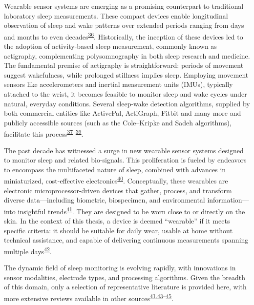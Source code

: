\documentclass[
  9pt,
]{scrbook}
\begin{document}
Wearable sensor systems are emerging as a promising counterpart to
traditional laboratory sleep measurements. These compact devices enable
longitudinal observation of sleep and wake patterns over extended
periods ranging from days and months to even
decades\textsuperscript{\protect\hyperlink{ref-borbuxe9ly_decades_wrist_2017}{36}}.
Historically, the inception of these devices led to the adoption of
activity-based sleep measurement, commonly known as actigraphy,
complementing polysomnography in both sleep research and medicine. The
fundamental premise of actigraphy is straightforward: periods of
movement suggest wakefulness, while prolonged stillness implies sleep.
Employing movement sensors like accelerometers and inertial measurement
units (IMUs), typically attached to the wrist, it becomes feasible to
monitor sleep and wake cycles under natural, everyday conditions.
Several sleep-wake detection algorithms, supplied by both commercial
entities like ActivePal, ActiGraph, Fitbit and many more and publicly
accessible sources (such as the Cole--Kripke and Sadeh algorithms),
facilitate this
process\textsuperscript{\protect\hyperlink{ref-cole_automatic_1992}{37}--\protect\hyperlink{ref-jean-louis_2001}{39}}.

The past decade has witnessed a surge in new wearable sensor systems
designed to monitor sleep and related bio-signals. This proliferation is
fueled by endeavors to encompass the multifaceted nature of sleep,
combined with advances in miniaturized, cost-effective
electronics\textsuperscript{\protect\hyperlink{ref-tobin_2021}{40}}.
Conceptually, these wearables are electronic microprocessor-driven
devices that gather, process, and transform diverse data---including
biometric, biospecimen, and environmental information---into insightful
trends\textsuperscript{\protect\hyperlink{ref-hollimon_2022}{41}}. They
are designed to be worn close to or directly on the skin. In the context
of this thesis, a device is deemed ``wearable'' if it meets specific
criteria: it should be suitable for daily wear, usable at home without
technical assistance, and capable of delivering continuous measurements
spanning multiple
days\textsuperscript{\protect\hyperlink{ref-schutte_2021}{42}}.

The dynamic field of sleep monitoring is evolving rapidly, with
innovations in sensor modalities, electrode types, and processing
algorithms. Given the breadth of this domain, only a selection of
representative literature is provided here, with more extensive reviews
available in other
sources\textsuperscript{\protect\hyperlink{ref-hollimon_2022}{41},\protect\hyperlink{ref-kwon_2021}{43}--\protect\hyperlink{ref-grandner_2019}{45}}.
\end{document}
